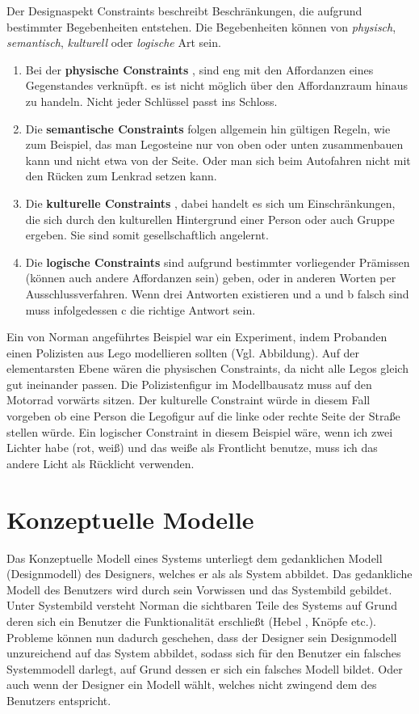 \documentclass[parskip,headsepline, headtopline, %
footsepline, oneside, 12pt, headings=small]{scrreprt}
\begin{document}
Der Designaspekt Constraints beschreibt Beschränkungen, die aufgrund bestimmter Begebenheiten entstehen. Die Begebenheiten können von \textit{physisch}, \textit{semantisch}, \textit{kulturell} oder \textit{logische} Art sein.

\begin{enumerate}
\item Bei der \textbf{physische Constraints} , sind eng mit den Affordanzen eines Gegenstandes verknüpft. es ist nicht möglich über den Affordanzraum hinaus zu handeln. Nicht jeder Schlüssel passt ins Schloss.
\item Die \textbf{semantische Constraints} folgen allgemein hin gültigen Regeln, wie zum Beispiel,  das man Legosteine nur von oben oder unten zusammenbauen kann und nicht etwa von der Seite. Oder man sich beim Autofahren  nicht mit den Rücken zum Lenkrad setzen kann.
\item Die \textbf{kulturelle Constraints} , dabei handelt es sich um Einschränkungen, die sich durch den kulturellen Hintergrund einer Person oder auch Gruppe ergeben. Sie sind somit gesellschaftlich angelernt.
\item Die \textbf{logische Constraints} sind aufgrund bestimmter vorliegender Prämissen (können auch andere Affordanzen sein) geben, oder in anderen Worten per \glqq Ausschlussverfahren\grqq. Wenn drei Antworten existieren und a und b falsch sind muss infolgedessen c die richtige Antwort sein. 
\end{enumerate}


Ein von Norman angeführtes Beispiel war ein Experiment, indem Probanden einen Polizisten aus  Lego modellieren sollten (Vgl. Abbildung).
Auf der elementarsten Ebene wären die physischen Constraints, da nicht alle Legos gleich gut ineinander passen. 
Die  Polizistenfigur im Modellbausatz muss auf den Motorrad vorwärts sitzen. Der kulturelle Constraint würde in diesem Fall vorgeben ob eine Person die Legofigur auf die linke oder rechte Seite der Straße stellen würde.  Ein logischer Constraint in diesem Beispiel wäre, wenn ich zwei Lichter habe (rot, weiß) und das weiße als Frontlicht benutze, muss ich das andere Licht als Rücklicht verwenden. 

\section{Konzeptuelle Modelle}

Das Konzeptuelle Modell eines Systems unterliegt dem gedanklichen Modell (Designmodell) des Designers, welches er als als System abbildet. Das gedankliche Modell des Benutzers wird durch sein Vorwissen und das Systembild gebildet. Unter Systembild versteht Norman die sichtbaren Teile des Systems auf Grund deren sich ein Benutzer die Funktionalität erschließt (Hebel , Knöpfe etc.). Probleme können nun dadurch geschehen, dass der Designer sein Designmodell unzureichend auf das System abbildet, sodass sich für den Benutzer ein falsches Systemmodell darlegt, auf Grund dessen er sich ein falsches Modell bildet. Oder auch wenn der Designer ein Modell wählt, welches nicht zwingend dem des Benutzers entspricht.
\end{document}
